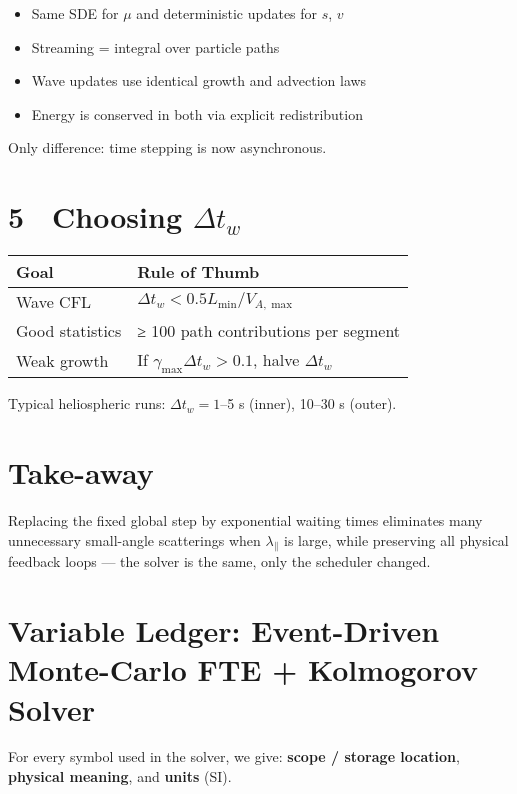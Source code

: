 {\begin{itemize}
\item Same SDE for $\mu$ and deterministic updates for $s$, $v$
\item Streaming = integral over particle paths
\item Wave updates use identical growth and advection laws
\item Energy is conserved in both via explicit redistribution
\end{itemize}

Only difference: time stepping is now asynchronous.

\section*{5 Choosing $\Delta t_w$}

\begin{tabular}{@{}ll@{}}
\toprule
\textbf{Goal} & \textbf{Rule of Thumb} \\
\midrule
Wave CFL        & $\Delta t_w < 0.5 L_{\min} / V_{A,\max}$ \\
Good statistics & ≥ 100 path contributions per segment \\
Weak growth     & If $\gamma_{\max} \Delta t_w > 0.1$, halve $\Delta t_w$ \\
\bottomrule
\end{tabular}

Typical heliospheric runs: $\Delta t_w = 1$–5 s (inner), 10–30 s (outer).

\section*{Take-away}

\begin{tcolorbox}
Replacing the fixed global step by exponential waiting times eliminates many unnecessary small-angle scatterings when $\lambda_\parallel$ is large, while preserving all physical feedback loops — the solver is the same, only the scheduler changed.
\end{tcolorbox}

\section*{Variable Ledger: Event-Driven Monte-Carlo FTE + Kolmogorov Solver}

For every symbol used in the solver, we give: \textbf{scope / storage location}, \textbf{physical meaning}, and \textbf{units} (SI).

}
